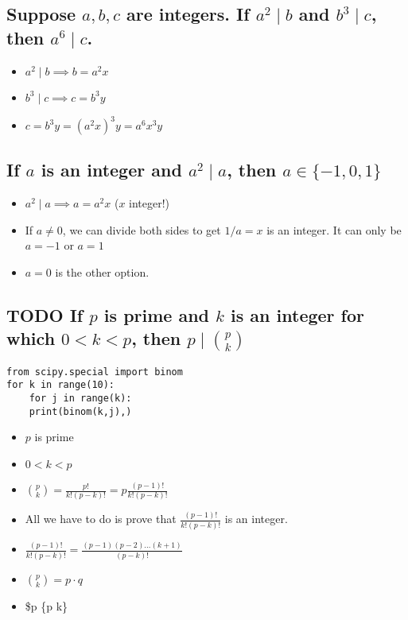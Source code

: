 \documentclass[11pt, oneside]{amsart}
\begin{document}
\subsection{Suppose \(a, b, c\) are integers.  If \(a^2 \mid b\) and \(b^3 \mid c\), then \(a^6 \mid c\).}
\label{sec:orgff1ad06}
\begin{itemize}
\item \(a^2 \mid b \implies b = a^2 x\)
\item \(b^3 \mid c \implies c = b^3 y\)
\item \(c = b^3 y = (a^2 x)^3 y = a^6 x^3 y\)
\end{itemize}

\subsection{If \(a\) is an integer and \(a^2 \mid a\), then \(a \in \{-1, 0 , 1\}\)}
\label{sec:org9a1aba4}
\begin{itemize}
\item \(a^2 \mid a \implies a = a^2 x\)  (\(x\) integer!)
\item If \(a \neq 0\), we can divide both sides to get \(1/a = x\) is an integer.  It can only be \(a=-1\) or \(a=1\)
\item \(a=0\) is the other option.
\end{itemize}

\subsection{{\bfseries\sffamily TODO} If \(p\) is prime and \(k\) is an integer for which \(0<k<p\), then \(p \mid {p \choose k}\)}
\label{sec:org6eebba7}
\begin{verbatim}
from scipy.special import binom
for k in range(10):
    for j in range(k):
	print(binom(k,j),)
\end{verbatim}


\begin{itemize}
\item \(p\) is prime
\item \(0<k<p\)
\item \({p \choose k} = \frac{p!}{k!(p-k)!} = p \frac{(p-1)!}{k!(p-k)!}\)
\item All we have to do is prove that \(\frac{(p-1)!}{k!(p-k)!}\) is an integer.
\item \(\frac{(p-1)!}{k!(p-k)!} = \frac{(p-1)(p-2)\dotsc(k+1)}{(p-k)!}\)
\item \({p \choose k} = p\cdot q\)
\item \$p \mid \{p \choose k\}
\end{itemize}
\end{document}
